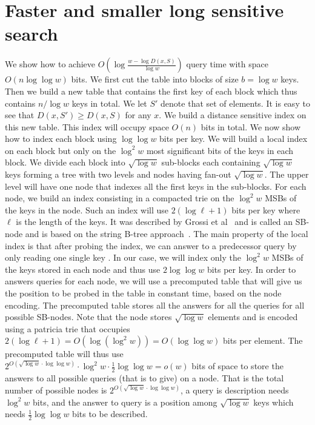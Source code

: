 \documentclass[11pt]{llncs}
\begin{document}
\section{Faster and smaller long sensitive search}
We show how to achieve $O(\log\frac{w-\log D(x,S)}{\log w})$ query time with space $O(n\log\log w)$ bits. 
We first cut the table into blocks of size $b=\log w$ keys. Then we build a new table that contains the first key of each block which thus contains $n/\log w$ keys in total. We let $S'$ denote that set of elements. It is easy to see that $D(x,S')\geq D(x,S)$ for any $x$. 
We build a distance sensitive index on this new table. This index will occupy space $O(n)$ bits in total. We now show how to index each block using $\log\log w$ bits per key. We will build a local index on each block but only on the $\log^2 w$ most significant bits of the keys in each block. We divide each block into $\sqrt{\log w}$ sub-blocks each containing $\sqrt{\log w}$ keys forming a tree with two levels and nodes having fan-out $\sqrt{\log w}$. The upper level will have one node that indexes all the first keys in the sub-blocks. For each node, we build an index consisting in a compacted trie on the $\log^2 w$ MSBs of the keys in the node. Such an index will use $2(\log\ell+1)$ bits per key where $\ell$ is the length of the keys. It was described by Grossi et al~\cite{GRR09} and is called an SB-node and is based on the string B-tree approach~\cite{FG99}. The main property of the local index is that after probing the index, we can answer to a predecessor query by only reading one single key . In our case, we will index only the $\log^2 w$ MSBs of the keys stored in each node and thus use $2\log\log w$ bits per key. In order to answers queries for each node, we will use a precomputed table that will give us the position to be probed in the table in constant time, based on the node encoding. The precomputed table stores all the answers for all the queries for all possible SB-nodes. Note that the node stores $\sqrt{\log w}$ elements and is encoded using a patricia trie that occupies $2(\log\ell+1)=O(\log(\log^2w))=O(\log\log w)$ bits per element. The precomputed table will thus use $2^{O(\sqrt{\log w}\cdot \log\log w)}\cdot\log^2w\cdot\frac{1}{2}\log\log w=o(w)$ bits of space to store the answers to all possible queries (that is to give) on a node. That is the total number of possible nodes is  $2^{O(\sqrt{\log w}\cdot \log\log w)}$, a query is description needs $\log^2w$ bits,  and the answer to query is a position among $\sqrt{\log w}$ keys which needs $\frac{1}{2}\log\log w$ bits to be described.
\end{document}
